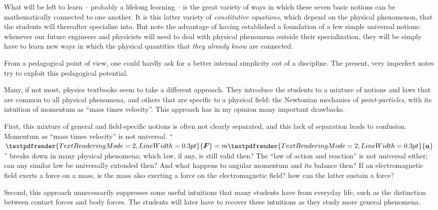 \documentclass[a4paper,12pt,%
onecolumn,oneside,titlepage,%
british%
]{memoir}
\renewcommand*{\bm}[1]{\textpdfrender{TextRenderingMode=2,LineWidth=0.3pt}{\boldsymbol{#1}}}
\renewcommand*{\|}[1][]{\nonscript\:#1\vert\nonscript\:\mathopen{}}
\begin{document}
What will be left to learn -- probably a lifelong learning -- is the great variety of ways in which these seven basic notions can be mathematically connected to one another. It is this latter variety of \emph{constitutive equations}, which depend on the physical phenomenon, that the students will thereafter specialize into. But note the advantage of having established a foundation of a few simple universal notions: whenever our future engineers and physicists will need to deal with physical phenomena outside their specialization, they will be simply have to learn new ways in which the physical quantities that \emph{they already know} are connected.

From a pedagogical point of view, one could hardly ask for a better internal simplicity out of a discipline. The present, very imperfect notes try to exploit this pedagogical potential.

\bigskip

Many, if not most, physics textbooks seem to take a different approach. They introduce the students to a mixture of notions and laws that are common to all physical phenomena, and others that are specific to a physical field: the Newtonian mechanics of \emph{point-particles}, with its intuition of momentum as \enquote{mass times velocity}. This approach has in my opinion many important drawbacks.

First, this mixture of general and field-specific notions is often not clearly separated, and this lack of separation leads to confusion. Momentum as \enquote{mass times velocity} is not universal. \enquote{$\bm{F}=m\bm{a}$} breaks down in many physical phenomena; which law, if any, is still valid then? The \enquote{law of action and reaction} is not universal either; can any similar law be universally extended then? And what happens to angular momentum and its balance then? If an electromagnetic field exerts a force on a mass, is the mass also exerting a force on the electromagnetic field? how can the latter sustain a force?

Second, this approach unnecessarily suppresses some useful intuitions that many students have from everyday life, such as the distinction between contact forces and body forces. The students will later have to recover these intuitions as they study more general phenomena.
\end{document}
